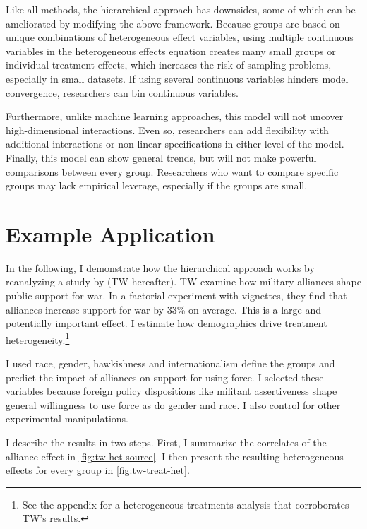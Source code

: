 \documentclass[12pt]{article}
\begin{document}
Like all methods, the hierarchical approach has downsides, some of which can be ameliorated by modifying the above framework. 
Because groups are based on unique combinations of heterogeneous effect variables, using multiple continuous variables in the heterogeneous effects equation creates many small groups or individual treatment effects, which increases the risk of sampling problems, especially in small datasets. 
If using several continuous variables hinders model convergence, researchers can bin continuous variables.


Furthermore, unlike machine learning approaches, this model will not uncover high-dimensional interactions. 
Even so, researchers can add flexibility with additional interactions or non-linear specifications in either level of the model. 
Finally, this model can show general trends, but will not make powerful comparisons between every group. 
Researchers who want to compare specific groups may lack empirical leverage, especially if the groups are small.



\section{Example Application} 


In the following, I demonstrate how the hierarchical approach works by reanalyzing a study by \citet{TomzWeeks2021} (TW hereafter). 
TW examine how military alliances shape public support for war.
In a factorial experiment with vignettes, they find that alliances increase support for war by 33\% on average. 
This is a large and potentially important effect. 
I estimate how demographics drive treatment heterogeneity.\footnote{See the appendix for a heterogeneous treatments analysis that corroborates TW's results.}


I used race, gender, hawkishness and internationalism define the groups and predict the impact of alliances on support for using force. 
I selected these variables because foreign policy dispositions like militant assertiveness shape general willingness to use force \citep{Kertzeretal2014} as do gender \citep{Barnhartetal2020} and race. 
I also control for other experimental manipulations. 


I describe the results in two steps. 
First, I summarize the correlates of the alliance effect in \autoref{fig:tw-het-source}.
I then present the resulting heterogeneous effects for every group in \autoref{fig:tw-treat-het}.
\end{document}
